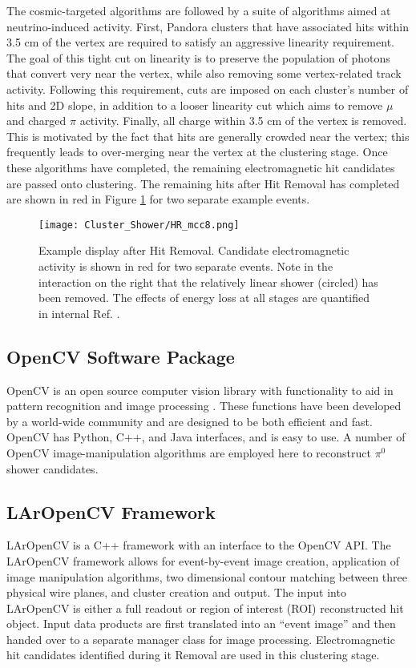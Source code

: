 \par The cosmic-targeted algorithms are followed by a suite of algorithms aimed at neutrino-induced activity. First, Pandora clusters that have associated hits within 3.5 cm of the vertex are required to satisfy an aggressive linearity requirement. The goal of this tight cut on linearity is to preserve the population of photons that convert very near the vertex, while also removing some vertex-related track activity. Following this requirement, cuts are imposed on each cluster's number of hits and 2D slope, in addition to a looser linearity cut which aims to remove $\mu$ and charged $\pi$ activity. Finally, all charge within 3.5 cm of the vertex is removed. This is motivated by the fact that hits are generally crowded near the vertex; this frequently leads to over-merging near the vertex at the clustering stage. Once these algorithms have completed, the remaining electromagnetic hit candidates are passed onto clustering. The remaining hits after Hit Removal has completed are shown in red in Figure \ref{fig:hitremoval} for two separate example events. 
\begin{figure}[h!]
\centering
\texttt{[image: Cluster\_Shower/HR\_mcc8.png]}
\caption{ Example display after Hit Removal. Candidate electromagnetic activity is shown in red for two separate events. Note in the interaction on the right that the relatively linear shower (circled) has been removed. The effects of energy loss at all stages are quantified in internal Ref. \cite{bib:davidc_missingE}.} 
\label{fig:hitremoval}
\end{figure}

\subsection{OpenCV Software Package}
OpenCV is an open source computer vision library with functionality to aid in pattern recognition and image processing \cite{bib:opencv}. These functions have been developed by a world-wide community and are designed to be both efficient and fast. OpenCV has Python, C++, and Java interfaces, and is easy to use. A number of OpenCV image-manipulation algorithms are employed here to reconstruct $\pi^0$ shower candidates.  

\subsection{LArOpenCV Framework}
LArOpenCV is a C++ framework with an interface to the OpenCV API. The LArOpenCV framework allows for event-by-event image creation, application of image manipulation algorithms, two dimensional contour matching between three physical wire planes, and cluster creation and output. The input into LArOpenCV is either a full readout or region of interest (ROI) reconstructed hit object. Input data products are first translated into an ``event image'' and then handed over to a separate manager class for image processing. Electromagnetic hit candidates identified during it Removal are used in this clustering stage. 

